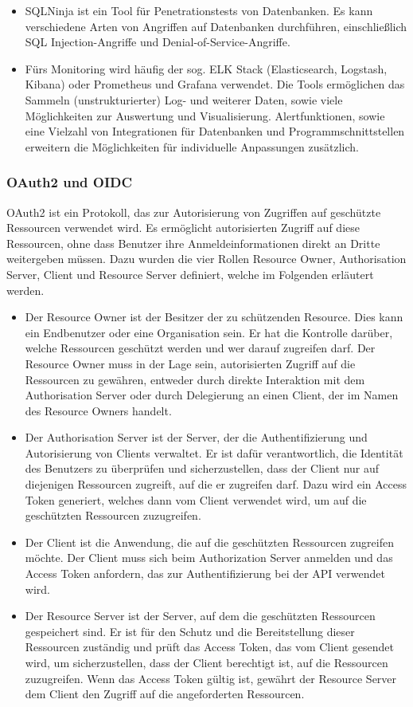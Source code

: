 \documentclass[notitlepage, hidelinks]{article}
\begin{document}
\begin{itemize}
\item SQLNinja ist ein Tool für Penetrationstests von Datenbanken. Es kann verschiedene Arten von Angriffen auf Datenbanken durchführen, einschließlich SQL Injection-Angriffe und Denial-of-Service-Angriffe.
\item Fürs Monitoring wird häufig der sog. ELK Stack (Elasticsearch, Logstash, Kibana) oder Prometheus und Grafana verwendet. Die Tools ermöglichen das Sammeln (unstrukturierter) Log- und weiterer Daten, sowie viele Möglichkeiten zur Auswertung und Visualisierung. Alertfunktionen, sowie eine Vielzahl von Integrationen für Datenbanken und Programmschnittstellen erweitern die Möglichkeiten für individuelle Anpassungen zusätzlich.
\end{itemize}
 
\subsubsection{OAuth2 und OIDC}
OAuth2 ist ein Protokoll, das zur Autorisierung von Zugriffen auf geschützte Ressourcen verwendet wird. Es ermöglicht autorisierten Zugriff auf diese Ressourcen, ohne dass Benutzer ihre Anmeldeinformationen direkt an Dritte weitergeben müssen. Dazu wurden die vier Rollen Resource Owner, Authorisation Server, Client und Resource Server definiert, welche im Folgenden erläutert werden. 
\begin{itemize}
\item Der Resource Owner ist der Besitzer der zu schützenden Resource. Dies kann ein Endbenutzer oder eine Organisation sein. Er hat die Kontrolle darüber, welche Ressourcen geschützt werden und wer darauf zugreifen darf. Der Resource Owner muss in der Lage sein, autorisierten Zugriff auf die Ressourcen zu gewähren, entweder durch direkte Interaktion mit dem Authorisation Server oder durch Delegierung an einen Client, der im Namen des Resource Owners handelt. 
\item Der Authorisation Server ist der Server, der die Authentifizierung und Autorisierung von Clients verwaltet. Er ist dafür verantwortlich, die Identität des Benutzers zu überprüfen und sicherzustellen, dass der Client nur auf diejenigen Ressourcen zugreift, auf die er zugreifen darf. Dazu wird ein Access Token generiert, welches dann vom Client verwendet wird, um auf die geschützten Ressourcen zuzugreifen. 
\item Der Client ist die Anwendung, die auf die geschützten Ressourcen zugreifen möchte. Der Client muss sich beim Authorization Server anmelden und das Access Token anfordern, das zur Authentifizierung bei der API verwendet wird. 
\item Der Resource Server ist der Server, auf dem die geschützten Ressourcen gespeichert sind. Er ist für den Schutz und die Bereitstellung dieser Ressourcen zuständig und prüft das Access Token, das vom Client gesendet wird, um sicherzustellen, dass der Client berechtigt ist, auf die Ressourcen zuzugreifen. Wenn das Access Token gültig ist, gewährt der Resource Server dem Client den Zugriff auf die angeforderten Ressourcen.
\end{itemize}
\end{document}
